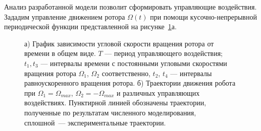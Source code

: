 Анализ разработанной модели позволит сформировать управляющие воздействия. Зададим управление движением ротора $\Omega(t)$  при помощи кусочно-непрерывной периодической функции представленной на рисунке~\ref{ControlAction}а.


\begin{figure}[!ht]
	\begin{minipage}[h]{0.3\linewidth}
	\end{minipage}
	\hfill
	\begin{minipage}[h]{0.7\linewidth}
	\end{minipage}
	\vfill
	\begin{minipage}[h]{0.3\linewidth}
	\end{minipage}
	\hfill
	\begin{minipage}[h]{0.7\linewidth}
	\end{minipage}
	\caption{а) График зависимости угловой скорости вращения ротора от времени в общем виде. $T$ --- период управляющего воздействия; $t_1, t_3$ --- интервалы времени с постоянными угловыми скоростями вращения ротора $\Omega_1$, $\Omega_2$ соответственно, $t_2$, $t_4$ --- интервалы равноускоренного вращения ротора. б) Траектории движения робота при  $ \Omega_1 = \Omega_{max} $, $ \Omega_2 = -\Omega_{max} $ и различных  управляющих воздействиях. Пунктирной линией обозначены траектории, полученные по результатам численного моделирования, сплошной~--- экспериментальные траектории.}
	\label{ControlAction}
\end{figure}

